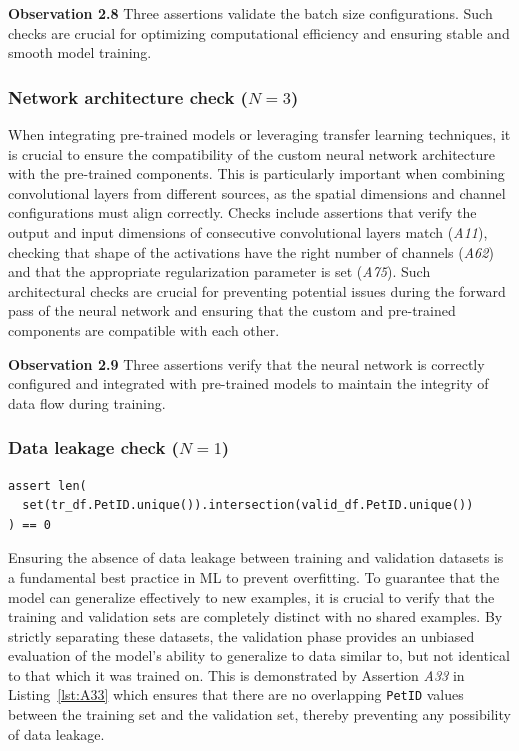\documentclass[smallextended]{svjour3}       %
\newcommand{\highlight}[1]{\begin{framed}%
  \noindent#1
\end{framed}}
\begin{document}
\highlight{\textbf{Observation 2.8} Three assertions validate the batch size configurations. Such checks are crucial for optimizing computational efficiency and ensuring stable and smooth model training.}

\subsubsection{Network architecture check ($N = 3$)}

When integrating pre-trained models or leveraging transfer learning techniques, it is crucial to ensure the compatibility of the custom neural network architecture with the pre-trained components. This is particularly important when combining convolutional layers from different sources, as the spatial dimensions and channel configurations must align correctly. Checks include assertions that verify the output and input dimensions of consecutive convolutional layers match (\emph{A11}), checking that shape of the activations have the right number of channels (\emph{A62}) and that the appropriate regularization parameter is set (\emph{A75}). Such architectural checks are crucial for preventing potential issues during the forward pass of the neural network and ensuring that the custom and pre-trained components are compatible with each other.

\highlight{\textbf{Observation 2.9} Three assertions verify that the neural network is correctly configured and integrated with pre-trained models to maintain the integrity of data flow during training.}

\subsubsection{Data leakage check ($N = 1$)}

\begin{lstlisting}[caption={Assertion \emph{A33} used to ensure that the training and validation sets do not contain any overlapping values.}, label={lst:A33}]
assert len(
  set(tr_df.PetID.unique()).intersection(valid_df.PetID.unique())
) == 0
\end{lstlisting}

Ensuring the absence of data leakage between training and validation datasets is a fundamental best practice in ML to prevent overfitting. To guarantee that the model can generalize effectively to new examples, it is crucial to verify that the training and validation sets are completely distinct with no shared examples. By strictly separating these datasets, the validation phase provides an unbiased evaluation of the model's ability to generalize to data similar to, but not identical to that which it was trained on. This is demonstrated by Assertion \emph{A33} in Listing~\ref{lst:A33} which ensures that there are no overlapping \lstinline{PetID} values between the training set and the validation set, thereby preventing any possibility of data leakage.
\end{document}
